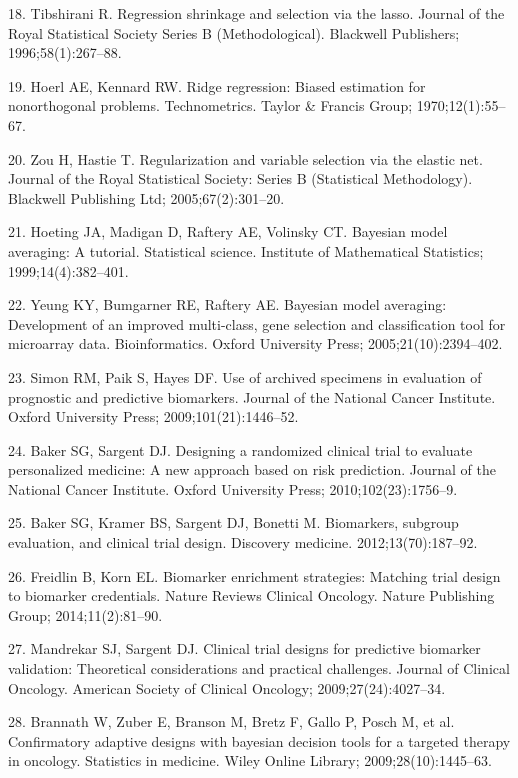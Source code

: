 \documentclass[11pt]{article}
\begin{document}
18. Tibshirani R. Regression shrinkage and selection via the lasso.
Journal of the Royal Statistical Society Series B (Methodological).
Blackwell Publishers; 1996;58(1):267--88.

19. Hoerl AE, Kennard RW. Ridge regression: Biased estimation for
nonorthogonal problems. Technometrics. Taylor \& Francis Group;
1970;12(1):55--67.

20. Zou H, Hastie T. Regularization and variable selection via the
elastic net. Journal of the Royal Statistical Society: Series B
(Statistical Methodology). Blackwell Publishing Ltd; 2005;67(2):301--20.

21. Hoeting JA, Madigan D, Raftery AE, Volinsky CT. Bayesian model
averaging: A tutorial. Statistical science. Institute of Mathematical
Statistics; 1999;14(4):382--401.

22. Yeung KY, Bumgarner RE, Raftery AE. Bayesian model averaging:
Development of an improved multi-class, gene selection and
classification tool for microarray data. Bioinformatics. Oxford
University Press; 2005;21(10):2394--402.

23. Simon RM, Paik S, Hayes DF. Use of archived specimens in evaluation
of prognostic and predictive biomarkers. Journal of the National Cancer
Institute. Oxford University Press; 2009;101(21):1446--52.

24. Baker SG, Sargent DJ. Designing a randomized clinical trial to
evaluate personalized medicine: A new approach based on risk prediction.
Journal of the National Cancer Institute. Oxford University Press;
2010;102(23):1756--9.

25. Baker SG, Kramer BS, Sargent DJ, Bonetti M. Biomarkers, subgroup
evaluation, and clinical trial design. Discovery medicine.
2012;13(70):187--92.

26. Freidlin B, Korn EL. Biomarker enrichment strategies: Matching trial
design to biomarker credentials. Nature Reviews Clinical Oncology.
Nature Publishing Group; 2014;11(2):81--90.

27. Mandrekar SJ, Sargent DJ. Clinical trial designs for predictive
biomarker validation: Theoretical considerations and practical
challenges. Journal of Clinical Oncology. American Society of Clinical
Oncology; 2009;27(24):4027--34.

28. Brannath W, Zuber E, Branson M, Bretz F, Gallo P, Posch M, et al.
Confirmatory adaptive designs with bayesian decision tools for a
targeted therapy in oncology. Statistics in medicine. Wiley Online
Library; 2009;28(10):1445--63.
\end{document}
